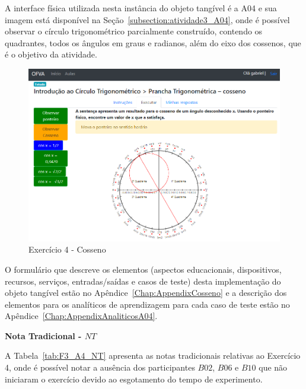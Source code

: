 A interface física utilizada nesta instância do objeto tangível é a A04 e sua imagem está disponível na Seção~\ref{subsection:atividade3_A04}, onde é possível observar o círculo trigonométrico parcialmente construído, contendo os quadrantes, todos os ângulos em graus e radianos, além do eixo dos cossenos, que é o objetivo da atividade.

\begin{figure}[!htb]
	\centering
	\includegraphics[width=0.9\linewidth]{chapters/results/Fase 3/E4_Virtual.png}
	\caption{Exercício 4 - Cosseno}
	\label{fig:E4}
\end{figure}

O formulário que descreve os elementos (aspectos educacionais, dispositivos, recursos, serviços, entradas/saídas e casos de teste) desta implementação do objeto tangível estão no Apêndice~\ref{Chap:AppendixCosseno} e a descrição dos elementos para os analíticos de aprendizagem para cada caso de teste estão no Apêndice~\ref{Chap:AppendixAnaliticosA04}.

\textbf{Nota Tradicional - $NT$}

A Tabela~\ref{tab:F3_A4_NT} apresenta as notas tradicionais relativas ao Exercício 4, onde é possível notar a ausência dos participantes $B02$, $B06$ e $B10$ que não iniciaram o exercício devido ao esgotamento do tempo de experimento.

